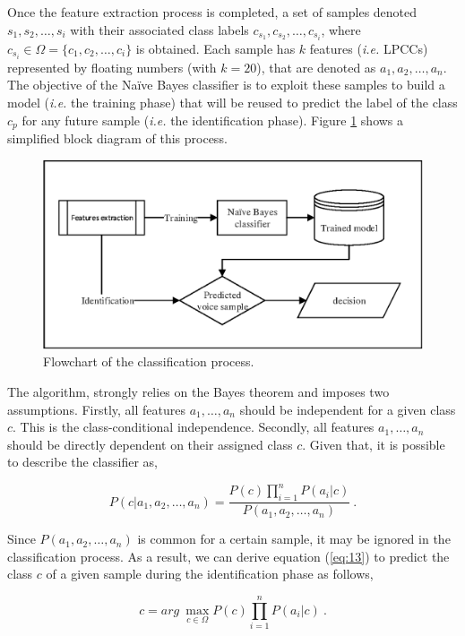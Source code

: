 \documentclass[cryptography,article,submit,moreauthors,pdftex,10pt,a4paper]{mdpi}
\begin{document}
Once the feature extraction process is completed, a set of samples denoted $s_1,s_2,\ldots,s_i$ with their associated class labels $c_{s_1}, c_{s_2}, \ldots, c_{s_i}$, where $c_{s_i}\in \Omega = \{c_1, c_2, \ldots, c_i\}$ is obtained. Each sample has $k$ features (\textit{i.e.} LPCCs) represented by floating numbers (with $k=20$), that are denoted as $a_1,a_2,\ldots,a_n$. The objective of the Na\"ive Bayes classifier is to exploit these samples to build a model (\textit{i.e.} the training phase) that will be reused to predict the label of the class $c_p$ for any future sample (\textit{i.e.} the identification phase). Figure \ref{fig:5} shows a simplified block diagram of this process.

\begin{figure}[H]
	\centering
	\includegraphics[width=10 cm]{5.eps}
	\caption{Flowchart of the classification process.}
	\label{fig:5}
\end{figure}

The algorithm, strongly relies on the Bayes theorem and imposes two assumptions. Firstly, all features $a_1,\ldots,a_n$ should be independent for a given class $c$. This is the class-conditional independence. Secondly, all features $a_1,\ldots,a_n$ should be directly dependent on their assigned class $c$. Given that, it is possible to describe the classifier as,

\begin{equation}
\label{eq:13}
  	P(c\vert a_1, a_2, \ldots , a_n) = \frac{P(c)\prod\limits_{i=1}^{n}P(a_i\vert c)}{P(a_1, a_2, \ldots , a_n)}~.
\end{equation}

Since $P(a_1,a_2,\ldots,a_n )$ is common for a certain sample, it may be ignored in the classification process. As a result, we can derive equation (\ref{eq:13}) to predict the class $c$ of a given sample during the identification phase as follows,

\begin{equation}
\label{eq:14}
  	c = arg~\max\limits_{c\in \Omega } P(c)\prod\limits_{i=1}^{n}P(a_i\vert c)~.
\end{equation}
\end{document}
